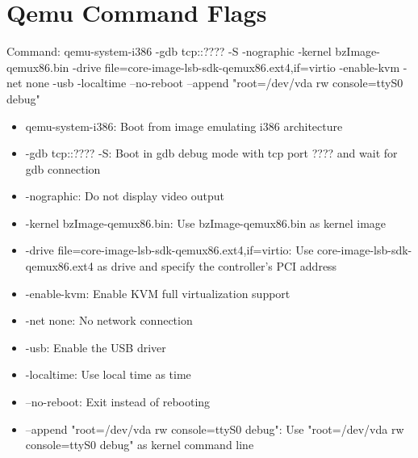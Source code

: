 \documentclass[10pt,draftclsnofoot,onecolumn]{IEEEtran}
\begin{document}
    \section{Qemu Command Flags}
    \par Command: qemu-system-i386 -gdb tcp::???? -S -nographic -kernel bzImage-qemux86.bin -drive file=core-image-lsb-sdk-qemux86.ext4,if=virtio -enable-kvm -net none -usb -localtime --no-reboot --append "root=/dev/vda rw console=ttyS0 debug"
    \begin{itemize}
    \item qemu-system-i386: Boot from image emulating i386 architecture
    \item -gdb tcp::???? -S: Boot in gdb debug mode with tcp port ???? and wait for gdb connection
    \item -nographic: Do not display video output
    \item -kernel bzImage-qemux86.bin: Use bzImage-qemux86.bin as kernel image
    \item -drive file=core-image-lsb-sdk-qemux86.ext4,if=virtio: Use core-image-lsb-sdk-qemux86.ext4 as drive and specify the controller’s PCI address
    \item -enable-kvm: Enable KVM full virtualization support
    \item -net none: No network connection
    \item -usb: Enable the USB driver
    \item -localtime: Use local time as time
    \item --no-reboot: Exit instead of rebooting
    \item --append "root=/dev/vda rw console=ttyS0 debug": Use "root=/dev/vda rw console=ttyS0 debug" as kernel command line
    \end{itemize}
    
\end{document}
